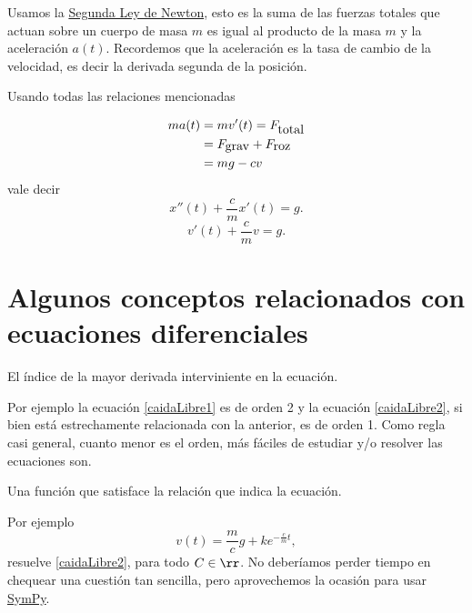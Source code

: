  Usamos la \href{http://es.wikipedia.org/wiki/Leyes_de_Newton}{Segunda Ley de Newton}, esto es la suma de las fuerzas totales que actuan sobre un cuerpo de masa $m$
es igual al producto de la masa $m$ y la aceleración $a(t)$.
Recordemos que la aceleración es la tasa de cambio de la velocidad, es decir la derivada 
segunda de la posición.   

  Usando todas las relaciones mencionadas

\[\begin{split} ma(t)&=mv'(t)=F_{\hbox{total}}\\
  &=F_{\hbox{grav}}+F_{\hbox{roz}}\\
  &=mg-cv
\end{split}
\]
vale decir
\begin{equation}\label{caidaLibre1}
 \boxed{ x''(t)+\frac{c}{m} x'(t)=g.}
\end{equation}
\begin{equation}\label{caidaLibre2}
\boxed{ v'(t)+\frac{c}{m} v=g.}
\end{equation}





\section{Algunos conceptos relacionados con ecuaciones diferenciales}

\begin{definicion}[Orden] El índice de la mayor derivada interviniente en la ecuación.
 \end{definicion}

 Por ejemplo la ecuación \eqref{caidaLibre1} es de orden 2 y la
ecuación \eqref{caidaLibre2}, si bien está estrechamente relacionada con la anterior, es de orden 1. Como regla casi general, cuanto menor es el orden,  más fáciles de estudiar y/o resolver las ecuaciones son.

  \begin{definicion}[Solución] Una función que satisface la relación que indica la ecuación.

   \end{definicion}

   Por ejemplo
\begin{equation}\label{SolGencaidaLibre2} v(t)=\frac{m}{c}g+ke^{-\frac{c}{m}t},\end{equation}
resuelve \eqref{caidaLibre2}, para todo $C\in\rr$. No deberíamos perder tiempo en chequear una cuestión tan sencilla, pero aprovechemos la ocasión para usar  \href{http://www.sympy.org}{SymPy}.





